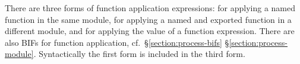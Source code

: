 There are three forms of function application expressions: for applying a
named function in the same module, for applying a named and exported function
in a different module, and for applying the value of a function expression.
There are also BIFs for function application, cf.\
\ifOld\S\ref{section:process-bifs}\fi
\ifStd\S\ref{section:process-module}\fi.  Syntactically the first form
is included in the third form.

\SYNTAX

\begin{rules}
       { \TXT{(}  \TXT{)} \OR
         \TXT{:} \NT{PrimaryExpr} \TXT{(}  \TXT{)} \OR
        \NT{PrimaryExpr}}
\end{rules}

\EVALUATION

